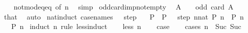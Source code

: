 \begin{isabellebody}
%
\isadelimproof
\ \ %
\endisadelimproof
%
\isatagproof
{}\isamarkupfalse%
\ not{\isacharunderscore}{\kern0pt}mod{\isacharunderscore}{\kern0pt}{}{\isacharunderscore}{\kern0pt}eq{\isacharunderscore}{\kern0pt}{}{\isacharunderscore}{\kern0pt}eq{\isacharunderscore}{\kern0pt}{}\ {\isacharbrackleft}{\kern0pt}of\ n{\isacharbrackright}{\kern0pt}\ \isamarkupfalse%
\ simp%
\endisatagproof
{\isafoldproof}%
%
\isadelimproof
\isanewline
%
\endisadelimproof
\isanewline
{}\isamarkupfalse%
\ odd{\isacharunderscore}{\kern0pt}card{\isacharunderscore}{\kern0pt}imp{\isacharunderscore}{\kern0pt}not{\isacharunderscore}{\kern0pt}empty{\isacharcolon}{\kern0pt}\isanewline
\ \ {\isacartoucheopen}A\ {\isasymnoteq}\ {\isacharbraceleft}{\kern0pt}{\isacharbraceright}{\kern0pt}{\isacartoucheclose}\ \ {\isacartoucheopen}odd\ {\isacharparenleft}{\kern0pt}card\ A{\isacharparenright}{\kern0pt}{\isacartoucheclose}\isanewline
%
\isadelimproof
\ \ %
\endisadelimproof
%
\isatagproof
{}\isamarkupfalse%
\ that\ \isamarkupfalse%
\ auto%
\endisatagproof
{\isafoldproof}%
%
\isadelimproof
\isanewline
%
\endisadelimproof
\isanewline
{}\isamarkupfalse%
\ nat{\isacharunderscore}{\kern0pt}induct{}\ {\isacharbrackleft}{\kern0pt}case{\isacharunderscore}{\kern0pt}names\ {}\ {}\ step{\isacharbrackright}{\kern0pt}{\isacharcolon}{\kern0pt}\isanewline
\ \ \ {\isachardoublequoteopen}P\ {}{\isachardoublequoteclose}\ {\isachardoublequoteopen}P\ {}{\isachardoublequoteclose}\ \ step{\isacharcolon}{\kern0pt}\ {\isachardoublequoteopen}{\isasymAnd}n{\isacharcolon}{\kern0pt}{\isacharcolon}{\kern0pt}nat{\isachardot}{\kern0pt}\ P\ n\ {\isasymLongrightarrow}\ P\ {\isacharparenleft}{\kern0pt}n\ {\isacharplus}{\kern0pt}\ {}{\isacharparenright}{\kern0pt}{\isachardoublequoteclose}\isanewline
\ \ \ {\isachardoublequoteopen}P\ n{\isachardoublequoteclose}\isanewline
%
\isadelimproof
%
\endisadelimproof
%
\isatagproof
{}\isamarkupfalse%
\ {\isacharparenleft}{\kern0pt}induct\ n\ rule{\isacharcolon}{\kern0pt}\ less{\isacharunderscore}{\kern0pt}induct{\isacharparenright}{\kern0pt}\isanewline
\ \ \isamarkupfalse%
\ {\isacharparenleft}{\kern0pt}less\ n{\isacharparenright}{\kern0pt}\isanewline
\ \ \isamarkupfalse%
\ {\isacharquery}{\kern0pt}case\isanewline
\ \ \isamarkupfalse%
\ {\isacharparenleft}{\kern0pt}cases\ {\isachardoublequoteopen}n\ {\isacharless}{\kern0pt}\ Suc\ {\isacharparenleft}{\kern0pt}Suc\ {}{\isacharparenright}{\kern0pt}{\isachardoublequoteclose}{\isacharparenright}{\kern0pt}\isanewline

\end{isabellebody}
